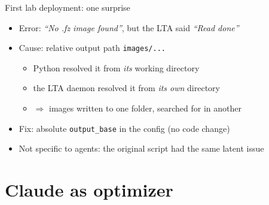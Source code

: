 \documentclass[aspectratio=169,10pt]{beamer}
\begin{document}
\begin{frame}{First lab deployment: one surprise}
  \begin{itemize}
    \item Error: \emph{``No .fz image found''}, but the LTA said \emph{``Read done''}
    \item Cause: relative output path \texttt{images/...}
      \begin{itemize}\small
        \item Python resolved it from \emph{its} working directory
        \item the LTA daemon resolved it from \emph{its own} directory
        \item $\Rightarrow$ images written to one folder, searched for in another
      \end{itemize}
    \item Fix: absolute \texttt{output\_base} in the config (no code change)
    \item Not specific to agents: the original script had the same latent issue
  \end{itemize}
\end{frame}

\section{Claude as optimizer}
\end{document}
